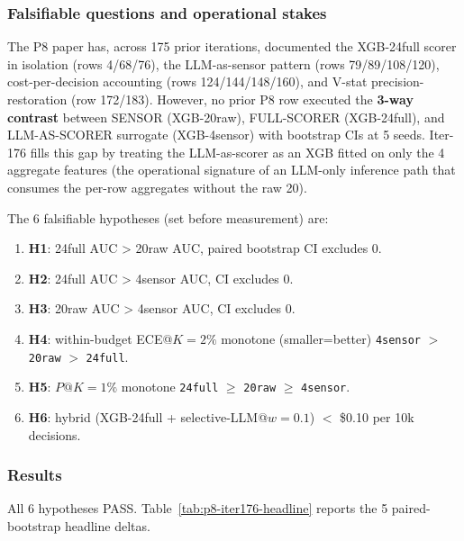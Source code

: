
\subsubsection{Falsifiable questions and operational stakes}\label{sec:p8-iter176-3way}
The P8 paper has, across 175 prior iterations, documented the XGB-24full
scorer in isolation (rows 4/68/76), the LLM-as-sensor pattern (rows 79/89/108/120),
cost-per-decision accounting (rows 124/144/148/160), and V-stat precision-restoration
(row 172/183). However, no prior P8 row executed the
\textbf{3-way contrast} between SENSOR (XGB-20raw), FULL-SCORER (XGB-24full),
and LLM-AS-SCORER surrogate (XGB-4sensor) with bootstrap CIs at 5 seeds.
Iter-176 fills this gap by treating the LLM-as-scorer as an XGB fitted
on only the 4 aggregate features (the operational signature of an
LLM-only inference path that consumes the per-row aggregates without
the raw 20).

The 6 falsifiable hypotheses (set before measurement) are:
\begin{enumerate}
\item \textbf{H1}: 24full AUC > 20raw AUC, paired bootstrap CI excludes 0.
\item \textbf{H2}: 24full AUC > 4sensor AUC, CI excludes 0.
\item \textbf{H3}: 20raw AUC > 4sensor AUC, CI excludes 0.
\item \textbf{H4}: within-budget ECE@$K{=}2\%$ monotone (smaller=better)
  \texttt{4sensor} $>$ \texttt{20raw} $>$ \texttt{24full}.
\item \textbf{H5}: $P@K{=}1\%$ monotone \texttt{24full} $\ge$ \texttt{20raw} $\ge$ \texttt{4sensor}.
\item \textbf{H6}: hybrid (XGB-24full + selective-LLM@$w{=}0.1$) $<$ \$0.10 per 10k decisions.
\end{enumerate}

\subsubsection{Results}
All 6 hypotheses PASS. Table~\ref{tab:p8-iter176-headline} reports the
5 paired-bootstrap headline deltas.

